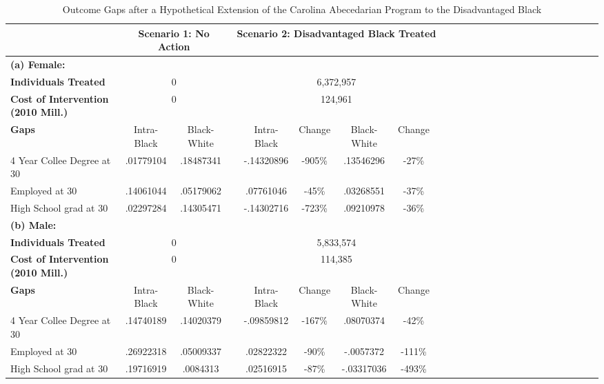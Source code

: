 \begin{table}[htbp]
\caption{\label{tab:tab_p} Outcome Gaps after a Hypothetical Extension of the Carolina Abecedarian Program to the Disadvantaged Black}\medskip
\footnotesize  \begin{center} \begin{tabular}{lcccccccccccccccccccccccc}  \hline \hline    
&\multicolumn{2}{c}{Scenario 1: No Action} &\multicolumn{6}{c}{Scenario 2: Disadvantaged Black Treated}  \\[0.05cm] \hline
 \textbf{(a) Female:} & \multicolumn{2}{c}{}   &  &\multicolumn{4}{c}{}   \\[0.02cm] 
\textbf{Individuals Treated} &\multicolumn{2}{c}{ 0 } &
 &\multicolumn{4}{c}{   6,372,957} &
 \\[0.2cm]  
\textbf{Cost of Intervention (2010 Mill.)} &\multicolumn{2}{c}{ 0 } &
 &\multicolumn{4}{c}{     124,961} &
 \\[0.2cm]  
\textbf{Gaps}&Intra-Black &Black-White & &Intra-Black &Change &Black-White &Change  \\[0.02cm] 
\hline
4 Year Collee Degree at 30 &.01779104&.18487341&&-.14320896&        -905\% &.13546296&         -27\% &
 \\[0.2cm]  
Employed at 30 &.14061044&.05179062&&.07761046&         -45\% &.03268551&         -37\% &
 \\[0.2cm]  
High School grad at 30 &.02297284&.14305471&&-.14302716&        -723\% &.09210978&         -36\% &
 \\[0.2cm]  
\hline
 \textbf{(b) Male:} & \multicolumn{2}{c}{}   &  &\multicolumn{4}{c}{}   \\[0.02cm] 
\textbf{Individuals Treated} &\multicolumn{2}{c}{ 0 } &
 &\multicolumn{4}{c}{   5,833,574} &
 \\[0.2cm]  
\textbf{Cost of Intervention (2010 Mill.)} &\multicolumn{2}{c}{ 0 } &
 &\multicolumn{4}{c}{     114,385} &
 \\[0.2cm]  
\textbf{Gaps}&Intra-Black &Black-White & &Intra-Black &Change &Black-White &Change  \\[0.02cm] 
\hline
4 Year Collee Degree at 30 &.14740189&.14020379&&-.09859812&        -167\% &.08070374&         -42\% &
 \\[0.2cm]  
Employed at 30 &.26922318&.05009337&&.02822322&         -90\% &-.0057372&        -111\% &
 \\[0.2cm]  
High School grad at 30 &.19716919&.0084313&&.02516915&         -87\% &-.03317036&        -493\% &
 \\[0.2cm]  

\end{tabular}
\end{center}
\end{table}

